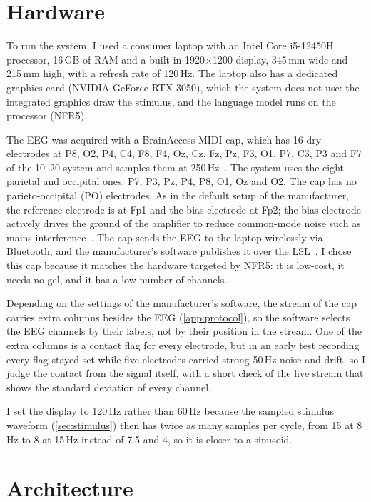 \section{Hardware}
\label{sec:hardware}

To run the system, I used a consumer laptop with an Intel Core i5-12450H processor,
16\,GB of RAM and a built-in 1920$\times$1200 display, 345\,mm wide and 215\,mm high,
with a refresh rate of 120\,Hz.
The laptop also has a dedicated graphics card (NVIDIA GeForce RTX 3050), which the
system does not use: the integrated graphics draw the stimulus, and the language model
runs on the processor (NFR5).

The \ac{EEG} was acquired with a BrainAccess MIDI cap, which has 16 dry electrodes at
P8, O2, P4, C4, F8, F4, Oz, Cz, Fz, Pz, F3, O1, P7, C3, P3 and F7 of the 10--20
system and samples them at 250\,Hz~\citep{brainaccess2026midi,brainaccess2025cap}.
The system uses the eight parietal and occipital
ones: P7, P3, Pz, P4, P8, O1, Oz and O2. The cap has no parieto-occipital (PO)
electrodes. As in the default setup of the manufacturer, the reference electrode is at
Fp1 and the bias electrode at Fp2; the bias electrode actively drives the ground of the
amplifier to reduce common-mode noise such as mains
interference~\citep{brainaccess2026midi}.
The cap sends the \ac{EEG} to the laptop wirelessly via Bluetooth, and the
manufacturer's software publishes it over the \ac{LSL}~\citep{kothe2025lsl}.
I chose this cap because it matches the hardware targeted by NFR5: it is low-cost, it
needs no gel, and it has a low number of channels.

Depending on the settings of the manufacturer's software, the stream of the cap carries
extra columns besides the \ac{EEG} (\cref{app:protocol}), so the software selects the
\ac{EEG} channels by their labels, not by their position in the stream. One of the
extra columns is a contact flag for every electrode, but in an early test recording
every flag stayed set while five electrodes carried strong 50\,Hz noise and drift, so I
judge the contact from the signal itself, with a short check of the live stream that
shows the standard deviation of every channel.

I set the display to 120\,Hz rather than 60\,Hz because the sampled stimulus waveform
(\cref{sec:stimulus}) then has twice as many samples per cycle, from 15 at 8\,Hz to 8 at
15\,Hz instead of 7.5 and 4, so it is closer to a sinusoid.


\section{Architecture}
\label{sec:architecture}

